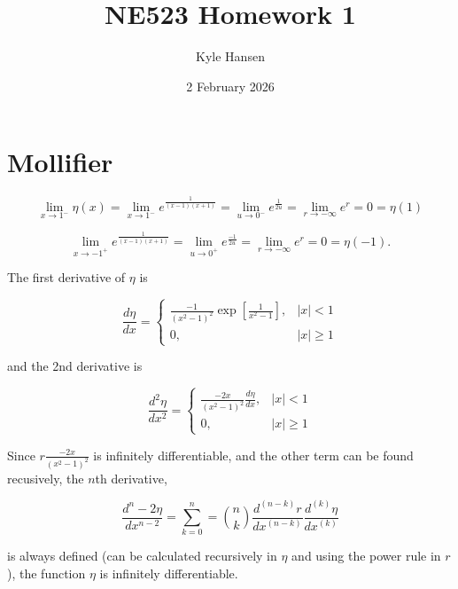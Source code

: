 \documentclass{hw-template}
\title{NE523 Homework 1}
\author{Kyle Hansen}
\date{2 February 2026}
\begin{document}
\maketitle{}

\section{Mollifier}

\begin{equation}
\lim_{x \rightarrow 1^-} \eta(x) = \lim_{x \rightarrow 1^-}  e^{\frac{1}{(x-1)(x+1)}} =\lim_{u \rightarrow 0^-}  e^{\frac{1}{2u}}= \lim_{r \rightarrow -\infty}  e^{r} = 0 = \eta(1)
\end{equation}

\begin{equation}
 \lim_{x \rightarrow -1^+}  e^{\frac{1}{(x-1)(x+1)}} =\lim_{u \rightarrow 0^+}  e^{\frac{-1}{2u}}= \lim_{r \rightarrow -\infty}  e^{r} = 0 = \eta(-1).
\end{equation}

The first derivative of $\eta$ is

\begin{equation}
    \frac{d \eta}{d x} = \begin{cases}
        \frac{-1}{(x^2 - 1)^2} \exp \left[\frac{1}{x^2 - 1}\right]  , & \vert x\vert < 1\\
        0,& \vert x\vert \geq 1
    \end{cases}
\end{equation}

and the 2nd derivative is

\begin{equation}
    \frac{d^2 \eta}{d x^2} = \begin{cases}
        \frac{-2x}{(x^2 - 1)^2} \frac{d \eta}{d x}   , & \vert x\vert < 1\\
        0,& \vert x\vert \geq 1
    \end{cases}
\end{equation}

Since $r \frac{-2x}{(x^2 - 1)^2}$ is infinitely differentiable, and the other term can be found recusively, the $n$th derivative, 

\begin{equation}
    \frac{d^n-2 \eta}{d x^{n-2}} = \sum_{k=0}^n = \binom{n}{k} \frac{d^(n-k)r}{dx^(n-k)} \frac{d^(k)\eta}{dx^(k)} 
\end{equation}

is always defined (can be calculated recursively in $\eta$ and using the power rule in $r$), the function $\eta$ is infinitely differentiable.
\end{document}
